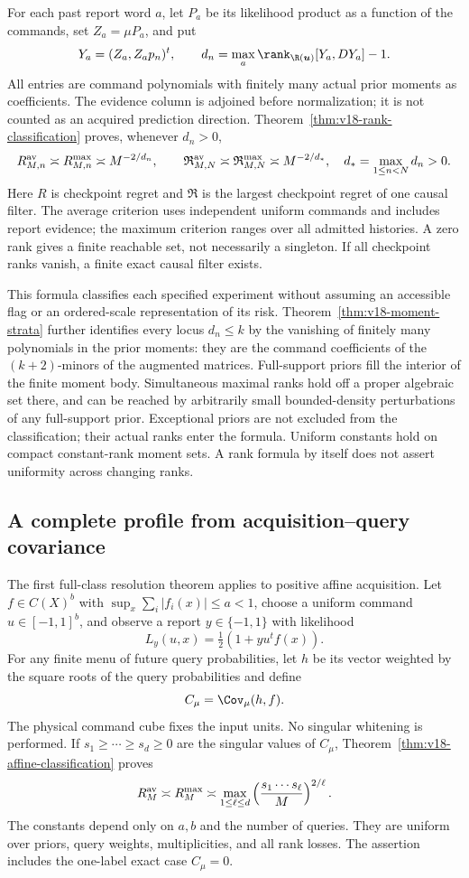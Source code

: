 For each past report word $a$, let $P_a$ be its likelihood product as a
function of the commands, set $Z_a=\mu P_a$, and put
\[
 Y_a=(Z_a,Z_ap_n)^t,\qquad
 d_n=\max_a\rank_{\R(\boldsymbol u)}[Y_a,DY_a]-1.
\]
All entries are command polynomials with finitely many actual prior
moments as coefficients. The evidence column is adjoined before
normalization; it is not counted as an acquired prediction direction.
Theorem~\ref{thm:v18-rank-classification} proves, whenever $d_n>0$,
\[
 R^{\rm av}_{M,n}\asymp R^{\rm max}_{M,n}\asymp M^{-2/d_n},
 \qquad
 \mathfrak R^{\rm av}_{M,N}\asymp
 \mathfrak R^{\rm max}_{M,N}\asymp M^{-2/d_*},
 \quad d_* =\max_{1\le n<N}d_n>0.
\]
Here $R$ is checkpoint regret and $\mathfrak R$ is the largest
checkpoint regret of one causal filter. The average criterion uses
independent uniform commands and includes report evidence; the maximum
criterion ranges over all admitted histories. A zero rank gives a
finite reachable set, not necessarily a singleton. If all checkpoint
ranks vanish, a finite exact causal filter exists.

This formula classifies each specified experiment without assuming an
accessible flag or an ordered-scale representation of its risk.
Theorem~\ref{thm:v18-moment-strata} further identifies every locus
$d_n\le k$ by the vanishing of finitely many polynomials in the prior
moments: they are the command coefficients of the $(k+2)$-minors of the
augmented matrices. Full-support priors fill the interior of the finite
moment body. Simultaneous maximal ranks hold off a proper algebraic
set there, and can be reached by arbitrarily small bounded-density
perturbations of any full-support prior. Exceptional priors are not
excluded from the classification; their actual ranks enter the formula.
Uniform constants hold on compact constant-rank moment sets. A rank
formula by itself does not assert uniformity across changing ranks.

\subsection{A complete profile from acquisition--query covariance}
The first full-class resolution theorem applies to positive affine
acquisition. Let $f\in C(X)^b$ with
$\sup_x\sum_i|f_i(x)|\le a<1$, choose a uniform command
$u\in[-1,1]^b$, and observe a report $y\in\{-1,1\}$ with likelihood
\[
 L_y(u,x)=\tfrac12(1+y u^tf(x)).
\]
For any finite menu of future query probabilities, let $h$ be its vector
weighted by the square roots of the query probabilities and define
\[
 C_\mu=\Cov_\mu(h,f).
\]
The physical command cube fixes the input units. No singular whitening
is performed. If $s_1\ge\cdots\ge s_d\ge0$ are the singular values
of $C_\mu$, Theorem~\ref{thm:v18-affine-classification} proves
\[
 R_M^{\rm av}\asymp R_M^{\rm max}\asymp
 \max_{1\le\ell\le d}
      \left(\frac{s_1\cdots s_\ell}{M}\right)^{2/\ell}.
\]
The constants depend only on $a,b$ and the number of queries. They are
uniform over priors, query weights, multiplicities, and all rank losses.
The assertion includes the one-label exact case $C_\mu=0$.

